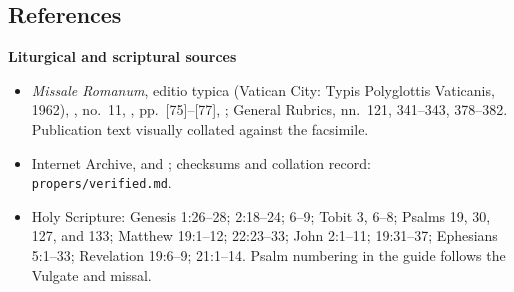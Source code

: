 \begin{deepstudy}
\begingroup
\renewcommand{\sacramentSummaryKicker}{{\footnotesize\bfseries Sacramental Appendix\enspace---\enspace}}

\endgroup

\section*{References}

\textbf{Liturgical and scriptural sources}
{\footnotesize
\begin{itemize}[itemsep=0em,topsep=0.15em,parsep=0pt]
\item \emph{Missale Romanum}, editio typica (Vatican City: Typis Polyglottis Vaticanis, 1962), , no.~11, , pp.~[75]--[77], ; General Rubrics, nn.~121, 341--343, 378--382. Publication text visually collated against the facsimile.
\item Internet Archive,  and ; checksums and collation record: \texttt{propers/verified.md}.
\item Holy Scripture: Genesis 1:26--28; 2:18--24; 6--9; Tobit 3, 6--8; Psalms 19, 30, 127, and 133; Matthew 19:1--12; 22:23--33; John 2:1--11; 19:31--37; Ephesians 5:1--33; Revelation 19:6--9; 21:1--14. Psalm numbering in the guide follows the Vulgate and missal.
\end{itemize}
}


\end{deepstudy}
